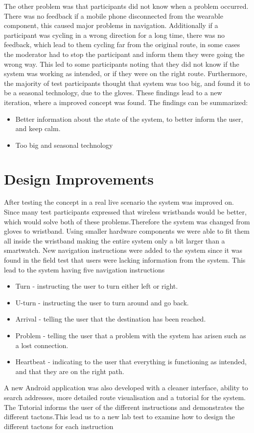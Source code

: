 \documentclass{sigchi}
\begin{document}
\newline
\newline 
The other problem was that participants did not know when a problem occurred. There was no feedback if a mobile phone disconnected from the wearable component, this caused major problems in navigation. Additionally if a participant was cycling in a wrong direction for a long time, there was no feedback, which lead to them cycling far from the original route, in some cases the moderator had to stop the participant and inform them they were going the wrong way. This led to some participants noting that they did not know if the system was working as intended, or if they were on the right route.
\newline
\newline 
Furthermore, the majority of test participants thought that system was too big, and found it to be a seasonal technology, due to the gloves.
These findings lead to a new iteration, where a improved concept was found. The findings can be summarized:
\begin{itemize}
\item Better information about the state of the system, to better inform the user, and keep calm.
\item Too big and seasonal technology 
\end{itemize}  
\section{Design Improvements}
After testing the concept in a real live scenario the system was improved on. Since many test participants expressed that wireless wristbands would be better, which would solve both of these problems.Therefore the system was changed from gloves to wristband. Using smaller hardware components we were able to fit them all inside the wristband making the entire system only a bit larger than a smartwatch.\newline
New navigation instructions were added to the system since it was found in the field test that users were lacking information from the system. This lead to the system having five navigation instructions
\begin{itemize}
\item Turn - instructing the user to turn either left or right.
\item U-turn - instructing the user to turn around and go back.
\item Arrival - telling the user that the destination has been reached. 
\item Problem - telling the user that a problem with the system has arisen such as a lost connection.
\item Heartbeat - indicating to the user that everything is functioning as intended, and that they are on the right path.
\end{itemize} 
A new Android application was also developed with a cleaner interface, ability to search addresses, more detailed route visualisation and a tutorial for the system. The Tutorial informs the user of the different instructions and demonstrates the different tactons.This lead us to a new lab test to examine how to design the different tactons for each instruction
\end{document}
